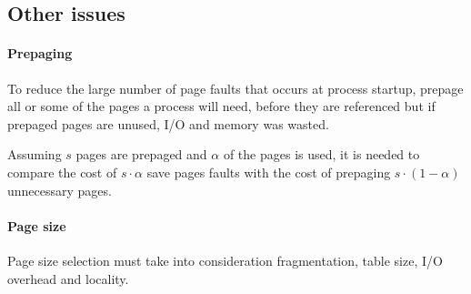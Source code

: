 \subsection{Other issues}
\paragraph{Prepaging}
To reduce the large number of page faults that occurs at process startup, prepage all or some of the pages a process will need, before they are referenced but if prepaged pages are unused, I/O and memory was wasted.

Assuming $s$ pages are prepaged and $\alpha$ of the pages is used, it is needed to compare the cost of $s \cdot \alpha$ save pages faults with the cost of prepaging $s \cdot (1-\alpha)$ unnecessary pages.

\paragraph{Page size}
Page size selection must take into consideration fragmentation, table size, I/O overhead and locality.